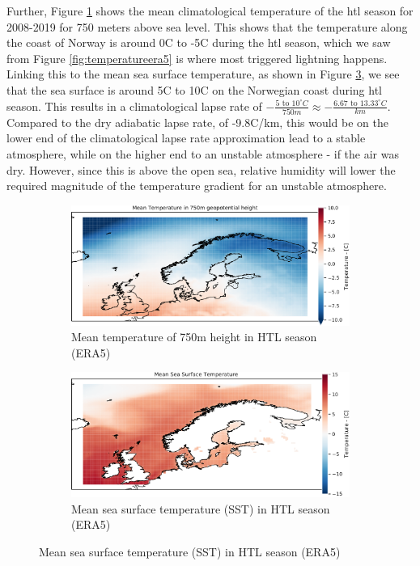 Further, Figure \ref{fig:meaneraT750} shows the mean climatological temperature of the \acrshort{htl} season for 2008-2019 for 750 meters above sea level. This shows that the temperature along the coast of Norway is around 0C to -5C during the \acrshort{htl} season, which we saw from Figure \ref{fig:temperatureera5} is where most triggered lightning happens. Linking this to the mean sea surface temperature, as shown in Figure \ref{fig:meanerasst}, we see that the sea surface is around 5C to 10C on the Norwegian coast during \acrshort{htl} season. This results in a climatological lapse rate of $-\frac{5 \text{ to } 10 ^{\circ}C}{750m} \approx -\frac{6.67 \text{ to }13.33 ^{\circ}C}{km}$. Compared to the dry adiabatic lapse rate, of -9.8C/km, this would be on the lower end of the climatological lapse rate approximation lead to a stable atmosphere, while on the higher end to an unstable atmosphere - if the air was dry. However, since this is above the open sea, relative humidity will lower the required magnitude of the temperature gradient for an unstable atmosphere. 


\begin{figure}
    \centering
    \begin{subfigure}{\textwidth}
    \includegraphics[width=\textwidth]{Figures/MeanT750era5.pdf}
    \caption{Mean temperature of 750m height in HTL season (ERA5)}
    \label{fig:meaneraT750}
    \end{subfigure}
    
    \begin{subfigure}{\textwidth}
    \includegraphics[width=\textwidth]{Figures/MeanSSTera5.pdf}
    \caption{Mean sea surface temperature (SST) in HTL season (ERA5)}
    \label{fig:meanerasst}
    \end{subfigure}
\end{figure}

